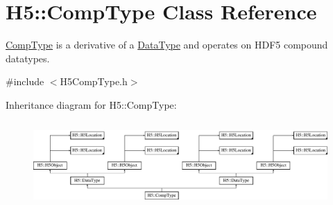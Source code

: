\hypertarget{class_h5_1_1_comp_type}{}\section{H5\+:\+:Comp\+Type Class Reference}
\label{class_h5_1_1_comp_type}


\hyperlink{class_h5_1_1_comp_type}{Comp\+Type} is a derivative of a \hyperlink{class_h5_1_1_data_type}{Data\+Type} and operates on H\+D\+F5 compound datatypes.  




{\ttfamily \#include $<$H5\+Comp\+Type.\+h$>$}

Inheritance diagram for H5\+:\+:Comp\+Type\+:\begin{figure}[H]
\begin{center}
\leavevmode
\includegraphics[height=3.301887cm]{class_h5_1_1_comp_type}
\end{center}
\end{figure}
